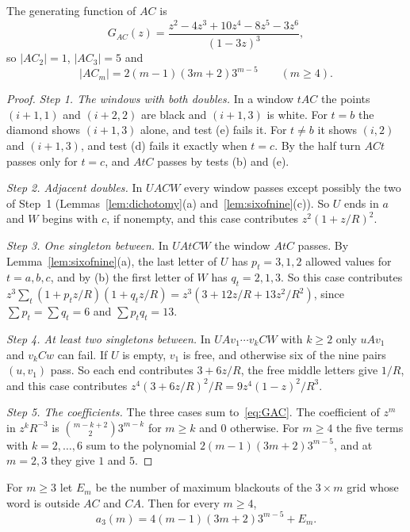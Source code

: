 \begin{proposition}\label{prop:threeGAC}
The generating function of $AC$ is
\begin{equation}\label{eq:GAC}
G_{AC}(z)=\frac{z^2-4z^3+10z^4-8z^5-3z^6}{(1-3z)^3},
\end{equation}
so $|AC_2|=1$, $|AC_3|=5$ and
\begin{equation}\label{eq:GACcoef}
|AC_m|=2(m-1)(3m+2)3^{m-5}\qquad(m\ge4).
\end{equation}
\end{proposition}

\begin{proof}
\emph{Step 1. The windows with both doubles.} In a window $tAC$ the points $(i+1,1)$ and
$(i+2,2)$ are black and $(i+1,3)$ is white. For $t=b$ the diamond shows $(i+1,3)$ alone, and
test (e) fails it. For $t\ne b$ it shows $(i,2)$ and $(i+1,3)$, and test (d) fails it exactly
when $t=c$. By the half turn $ACt$ passes only for $t=c$, and $AtC$ passes by tests (b) and (e).

\emph{Step 2. Adjacent doubles.} In $UACW$ every window passes except possibly the two of
Step~1 (Lemmas~\ref{lem:dichotomy}(a) and~\ref{lem:sixofnine}(c)). So $U$ ends in $a$ and $W$
begins with $c$, if nonempty, and this case contributes $z^2(1+z/R)^2$.

\emph{Step 3. One singleton between.} In $UAtCW$ the window $AtC$ passes. By
Lemma~\ref{lem:sixofnine}(a), the last letter of $U$ has $p_t=3,1,2$ allowed values for
$t=a,b,c$, and by (b) the first letter of $W$ has $q_t=2,1,3$. So this case contributes
$z^3\sum_t(1+p_tz/R)(1+q_tz/R)=z^3(3+12z/R+13z^2/R^2)$, since $\sum p_t=\sum q_t=6$ and
$\sum p_tq_t=13$.

\emph{Step 4. At least two singletons between.} In $UAv_1\cdots v_kCW$ with $k\ge2$ only
$uAv_1$ and $v_kCw$ can fail. If $U$ is empty, $v_1$ is free, and otherwise six of the nine
pairs $(u,v_1)$ pass. So each end contributes $3+6z/R$, the free middle letters give $1/R$, and
this case contributes $z^4(3+6z/R)^2/R=9z^4(1-z)^2/R^3$.

\emph{Step 5. The coefficients.} The three cases sum to~\eqref{eq:GAC}. The coefficient of $z^m$ in $z^kR^{-3}$ is
$\binom{m-k+2}23^{m-k}$ for $m\ge k$ and $0$ otherwise. For $m\ge4$ the five terms with
$k=2,\dots,6$ sum to the polynomial $2(m-1)(3m+2)3^{m-5}$, and at $m=2,3$ they give $1$ and $5$.
\end{proof}

\begin{theorem}\label{thm:threecount}
For $m\ge3$ let $E_m$ be the number of maximum blackouts of the $3\times m$ grid whose word is
outside $AC$ and $CA$. Then for every $m\ge4$,
\begin{equation}\label{eq:threecount}
a_3(m)=4(m-1)(3m+2)3^{m-5}+E_m.
\end{equation}
\end{theorem}

